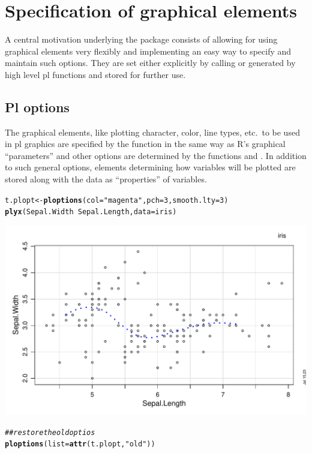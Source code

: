 \documentclass[11pt]{article}\usepackage[]{graphicx}\usepackage[]{color}
\makeatletter
\def\maxwidth{ %
  \ifdim\Gin@nat@width>\linewidth
    \linewidth
  \else
    \Gin@nat@width
  \fi
}
\newcommand{\hlnum}[1]{\textcolor[rgb]{0.686,0.059,0.569}{#1}}%
\newcommand{\hlstr}[1]{\textcolor[rgb]{0.192,0.494,0.8}{#1}}%
\newcommand{\hlcom}[1]{\textcolor[rgb]{0.678,0.584,0.686}{\textit{#1}}}%
\newcommand{\hlopt}[1]{\textcolor[rgb]{0,0,0}{#1}}%
\newcommand{\hlstd}[1]{\textcolor[rgb]{0.345,0.345,0.345}{#1}}%
\newcommand{\hlkwb}[1]{\textcolor[rgb]{0.69,0.353,0.396}{#1}}%
\newcommand{\hlkwc}[1]{\textcolor[rgb]{0.333,0.667,0.333}{#1}}%
\newcommand{\hlkwd}[1]{\textcolor[rgb]{0.737,0.353,0.396}{\textbf{#1}}}%
\newenvironment{kframe}{%
 \def\at@end@of@kframe{}%
 \ifinner\ifhmode%
  \def\at@end@of@kframe{\end{minipage}}%
  \begin{minipage}{\columnwidth}%
 \fi\fi%
 \def\FrameCommand##1{\hskip\@totalleftmargin \hskip-\fboxsep
 \colorbox{shadecolor}{##1}\hskip-\fboxsep
     \hskip-\linewidth \hskip-\@totalleftmargin \hskip\columnwidth}%
 \MakeFramed {\advance\hsize-\width
   \@totalleftmargin\z@ \linewidth\hsize
   \@setminipage}}%
 {\par\unskip\endMakeFramed%
 \at@end@of@kframe}
\newenvironment{knitrout}{}{} %
\makeatother
\begin{document}
\section{Specification of graphical elements}
A central motivation underlying the  package consists of
allowing for using graphical elements very flexibly and implementing an
easy way to specify and maintain such options.
They are set either explicitly by calling  or generated
by high level pl functions and stored for further use.

\subsection{Pl options}
The graphical elements, like plotting character, color, line types, etc.\ 
to be used in pl graphics are specified by the function 
in the same way as R's graphical ``parameters'' and other options are 
determined by the functions \T{par} and \T{options}.
In addition to such general options, 
elements determining how variables will be plotted are stored along 
with the data as ``properties'' of variables.

\begin{knitrout}
\color{fgcolor}\begin{kframe}
\begin{alltt}
\hlstd{t.plopt} \hlkwb{<-} \hlkwd{ploptions}\hlstd{(}\hlkwc{col}\hlstd{=}\hlstr{"magenta"}\hlstd{,} \hlkwc{pch}\hlstd{=}\hlnum{3}\hlstd{,} \hlkwc{smooth.lty}\hlstd{=}\hlnum{3}\hlstd{)}
\hlkwd{plyx}\hlstd{(Sepal.Width}\hlopt{~}\hlstd{Sepal.Length,} \hlkwc{data}\hlstd{=iris)}
\end{alltt}
\end{kframe}
\includegraphics[width=\maxwidth]{figure/ploptions-1} 
\begin{kframe}\begin{alltt}
\hlcom{## restore the old optios}
\hlkwd{ploptions}\hlstd{(}\hlkwc{list}\hlstd{=}\hlkwd{attr}\hlstd{(t.plopt,} \hlstr{"old"}\hlstd{))}
\end{alltt}
\end{kframe}
\end{knitrout}
\end{document}
